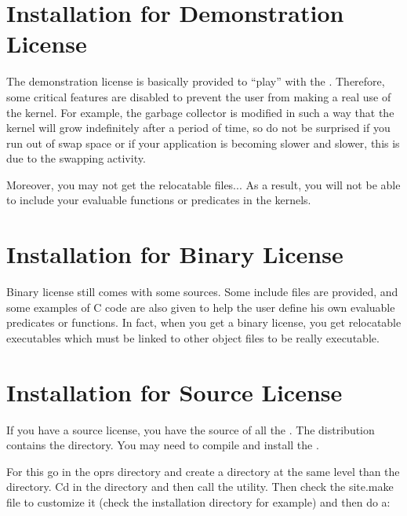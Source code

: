 \section{Installation for Demonstration License}

The demonstration license is basically provided to ``play'' with the
\COPRSDE{}. Therefore, some critical features are disabled to
prevent the user from making a real use of the kernel. For example, the garbage
collector is modified in such a way that the kernel will grow indefinitely
after a period of time, so do not be surprised if you run out of swap space or
if your application is becoming slower and slower, this is due to the swapping
activity.

Moreover, you may not get the relocatable files... As a result, you will
not be able to include your evaluable functions or predicates in the
kernels.

\section{Installation for Binary License}

Binary license still comes with some sources. Some include files are
provided, and some examples of C code are also given to help the user
define his own evaluable predicates or functions. In fact, when you get a
binary license, you get relocatable executables which must be linked to
other object files to be really executable.

\section{Installation for Source License}

If you have a source license, you have the source of all the \COPRSDE{}.
The distribution contains the  directory.
You may need to compile and install the \COPRSDE{}.

For this go in the oprs directory and create a  directory at the
same level than the   directory. Cd in the  directory and
then call the  utility. Then check the site.make file
to customize it (check the installation directory for example) and then do a:


